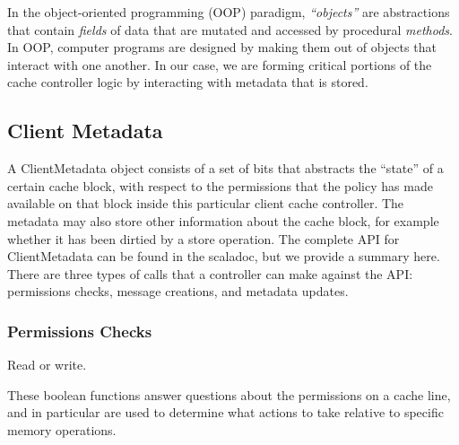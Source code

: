In the object-oriented programming (OOP) paradigm, \emph{``objects''} are abstractions that contain \emph{fields} of data that are mutated and accessed by procedural \emph{methods}.
In OOP, computer programs are designed by making them out of objects that interact with one another.
In our case, we are forming critical portions of the cache controller logic by interacting with metadata that is stored.


\subsection{Client Metadata} 

A ClientMetadata object consists of a set of bits that abstracts the “state” of a certain cache block,
with respect to the permissions that the policy has made available on that block inside this particular client cache controller.
The metadata may also store other information about the cache block,
for example whether it has been dirtied by a store operation.
The complete API for ClientMetadata can be found in the scaladoc, but we provide a summary here.
There are three types of calls that a controller can make against the API:
permissions checks, message creations, and metadata updates.

\subsubsection{Permissions Checks}

Read or write.

These boolean functions answer questions about the permissions on a cache line, and in particular are used to determine what actions to take relative to specific memory operations.

